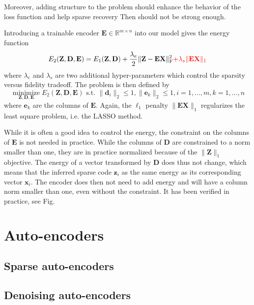 \documentclass[a4paper,12pt,twoside]{report}
\newcommand{\R}{\mathbb{R}}
\DeclareMathOperator*{\minimizeop}{minimize}
\newcommand{\minimize}[1]{\minimizeop\limits_{#1}}  %
\newcommand{\normO}[1]{\| #1 \|_1}
\newcommand{\normF}[1]{\| #1 \|_\text{F}^2}
\newcommand{\D}{\mathbf{D}}
\newcommand{\E}{\mathbf{E}}
\newcommand{\X}{\mathbf{X}}
\newcommand{\Z}{\mathbf{Z}}
\renewcommand{\d}{\mathbf{d}}
\newcommand{\e}{\mathbf{e}}
\newcommand{\x}{\mathbf{x}}
\newcommand{\z}{\mathbf{z}}
\newcommand{\Eone}{E_1(\Z, \D)}
\newcommand{\Etwo}{E_2(\Z, \D, \E)}
\newcommand{\st}{\text{ s.t. }}
\newcommand{\cst}[2]{\|#1_#2\|_2 \leq 1}
\newcommand{\forallx}[2]{#1 = 1, \ldots, #2}
\begin{document}
Moreover, adding structure to the problem should enhance the behavior of the loss function and help sparse recovery \cite{kowalski2009sparse, baraniuk2010modelCS, huang2011LearningStructuredSparsity, jenatton2011structured} {\color{red}Then \cite{donoho2003OptSparse} should not be strong enough.}

Introducing a trainable encoder $\E \in \R^{m \times n}$ into our model gives the energy function
\begin{equation}\label{eqn:en_encoder}
	\Etwo = \Eone + \frac{\lambda_e}{2} \normF{\Z - \E \X} {\color{red} + \lambda_s \normO{\E \X}}
\end{equation}
where $\lambda_e$ and $\lambda_s$ are two additional hyper-parameters which control the sparsity versus fidelity tradeoff. The problem is then defined by
\begin{equation}\label{eqn:pr_encoder}
	\minimize{\Z,\D,\E} \Etwo \st \cst{\d}{i} , \cst{\e}{k} ,
	\forallx{i}{m} , \forallx{k}{n}
\end{equation}
where $\e_k$ are the columns of $\E$. Again, the $\ell_1$ penalty $\normO{\E \X}$ regularizes the least square problem, i.e. the \gls{LASSO} method.

While it is often a good idea to control the energy, the constraint on the columns of $\E$ is not needed in practice. While the columns of $\D$ are constrained to a norm smaller than one, they are in practice normalized because of the $\normO{\Z}$ objective. The energy of a vector transformed by $\D$ does thus not change, which means that the inferred sparse code $\z_i$ as the same energy as its corresponding vector $\x_i$. The encoder does then not need to add energy and will have a column norm smaller than one, even without the constraint. It has been verified in practice, see {\color{red} Fig}.

\section{Auto-encoders}

\subsection{Sparse auto-encoders}

\subsection{Denoising auto-encoders}
\end{document}
